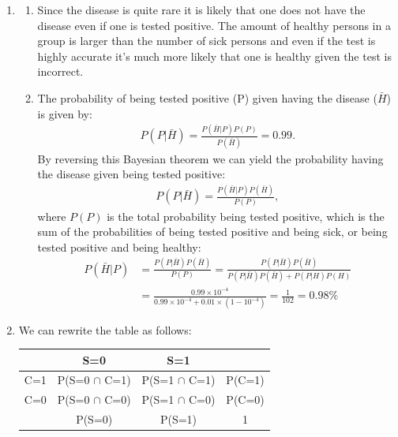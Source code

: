 \documentclass[12pt]{article}
\begin{document}
\begin{enumerate}
	\item 
	\begin{enumerate}[label=(\alph*)]
		\item Since the disease is quite rare it is likely that one does not have the disease even if one is tested positive. The amount of healthy persons in a group is larger than the number of sick persons and even if the test is highly accurate it's much more likely that one is healthy given the test is incorrect. 
		\item The probability of being tested positive (P) given having the disease ($\bar{H}$) is given by:
		\begin{align}
			P(P|\bar{H})=\frac{P(\bar{H}|P)P(P)}{P(\bar{H})}=0.99.
		\end{align}
		By reversing this Bayesian theorem we can yield the probability having the disease given being tested positive:
		\begin{align}
			P(P|\bar{H})=\frac{P(\bar{H}|P)P(\bar{H})}{P(P)},
		\end{align}
		where $P(P)$ is the total probability being tested positive, which is the sum of the probabilities of being tested positive and being sick, or being tested positive and being healthy:
		\begin{align}
		P(\bar{H}|P)&=\frac{P(P|\bar{H})P(\bar{H})}{P(P)}=\frac{P(P|\bar{H})P(\bar{H})}{P(P|\bar{H})P(\bar{H})+P(P|H)P(H)}\\
		&=\frac{0.99\times 10^{-4}}{0.99\times 10^{-4}+0.01\times(1-10^{-4})}=\frac{1}{102}=0.98\%
		\end{align}
	\end{enumerate}
	\item We can rewrite the table as follows:
	\begin{table}[h!]
		\centering
		\begin{tabular}{|c|c|c|c|}
			\toprule
			& S=0   & S=1   &  \\
			\midrule
			C=1   & P(S=0 $\cap$ C=1)    & P(S=1 $\cap$ C=1)    & P(C=1) \\
			\midrule
			C=0   & P(S=0 $\cap$ C=0)    & P(S=1 $\cap$ C=0)    & P(C=0) \\
			\midrule
			& P(S=0) & P(S=1) & 1 \\
			\bottomrule
		\end{tabular}%
	\end{table}%
	\begin{table}[h!]
		\centering

\end{table}
\end{enumerate}
\end{document}
